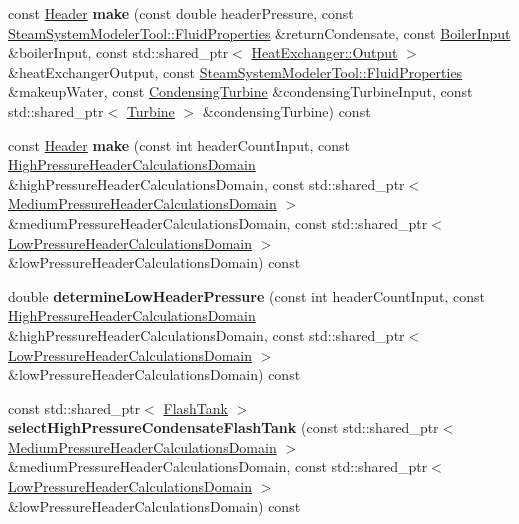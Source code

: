\begin{DoxyCompactItemize}
const \hyperlink{class_header}{Header} {\bfseries make} (const double header\+Pressure, const \hyperlink{struct_steam_system_modeler_tool_1_1_fluid_properties}{Steam\+System\+Modeler\+Tool\+::\+Fluid\+Properties} \&return\+Condensate, const \hyperlink{class_boiler_input}{Boiler\+Input} \&boiler\+Input, const std\+::shared\+\_\+ptr$<$ \hyperlink{struct_heat_exchanger_1_1_output}{Heat\+Exchanger\+::\+Output} $>$ \&heat\+Exchanger\+Output, const \hyperlink{struct_steam_system_modeler_tool_1_1_fluid_properties}{Steam\+System\+Modeler\+Tool\+::\+Fluid\+Properties} \&makeup\+Water, const \hyperlink{class_condensing_turbine}{Condensing\+Turbine} \&condensing\+Turbine\+Input, const std\+::shared\+\_\+ptr$<$ \hyperlink{class_turbine}{Turbine} $>$ \&condensing\+Turbine) const
\item 
\mbox{\label{class_header_factory_affb7bdf26093f8f662366a312b997d09}} 
const \hyperlink{class_header}{Header} {\bfseries make} (const int header\+Count\+Input, const \hyperlink{class_high_pressure_header_calculations_domain}{High\+Pressure\+Header\+Calculations\+Domain} \&high\+Pressure\+Header\+Calculations\+Domain, const std\+::shared\+\_\+ptr$<$ \hyperlink{class_medium_pressure_header_calculations_domain}{Medium\+Pressure\+Header\+Calculations\+Domain} $>$ \&medium\+Pressure\+Header\+Calculations\+Domain, const std\+::shared\+\_\+ptr$<$ \hyperlink{class_low_pressure_header_calculations_domain}{Low\+Pressure\+Header\+Calculations\+Domain} $>$ \&low\+Pressure\+Header\+Calculations\+Domain) const
\item 
\mbox{\label{class_header_factory_af015658ac803d2fb4248f59847c40338}} 
double {\bfseries determine\+Low\+Header\+Pressure} (const int header\+Count\+Input, const \hyperlink{class_high_pressure_header_calculations_domain}{High\+Pressure\+Header\+Calculations\+Domain} \&high\+Pressure\+Header\+Calculations\+Domain, const std\+::shared\+\_\+ptr$<$ \hyperlink{class_low_pressure_header_calculations_domain}{Low\+Pressure\+Header\+Calculations\+Domain} $>$ \&low\+Pressure\+Header\+Calculations\+Domain) const
\item 
\mbox{\label{class_header_factory_a292dfee908d96fa136ae530667bd661d}} 
const std\+::shared\+\_\+ptr$<$ \hyperlink{class_flash_tank}{Flash\+Tank} $>$ {\bfseries select\+High\+Pressure\+Condensate\+Flash\+Tank} (const std\+::shared\+\_\+ptr$<$ \hyperlink{class_medium_pressure_header_calculations_domain}{Medium\+Pressure\+Header\+Calculations\+Domain} $>$ \&medium\+Pressure\+Header\+Calculations\+Domain, const std\+::shared\+\_\+ptr$<$ \hyperlink{class_low_pressure_header_calculations_domain}{Low\+Pressure\+Header\+Calculations\+Domain} $>$ \&low\+Pressure\+Header\+Calculations\+Domain) const
\end{DoxyCompactItemize}


